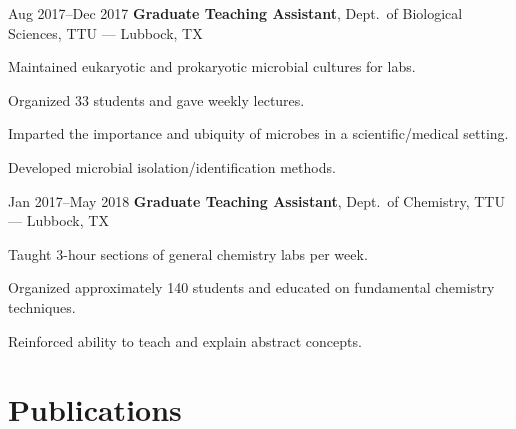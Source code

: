 \documentclass{resume}
\begin{document}
        \begin{twocolentry}{Aug 2017--Dec 2017}
            \textbf{Graduate Teaching Assistant}, Dept.\ of Biological Sciences, TTU --- Lubbock, TX
        \end{twocolentry}
        \vspace{0.10cm}
        \begin{onecolentry}
            \begin{highlights}
                \item Maintained eukaryotic and prokaryotic microbial cultures for labs.
                \item Organized 33 students and gave weekly lectures.
                \item Imparted the importance and ubiquity of microbes in a scientific/medical setting.
                \item Developed microbial isolation/identification methods.
            \end{highlights}
        \end{onecolentry}
        \vspace{0.2cm}

        \begin{twocolentry}{Jan 2017--May 2018}
            \textbf{Graduate Teaching Assistant}, Dept.\ of Chemistry, TTU --- Lubbock, TX
        \end{twocolentry}
        \vspace{0.10cm}
        \begin{onecolentry}
            \begin{highlights}
                \item Taught 3-hour sections of general chemistry labs per week.
                \item Organized approximately 140 students and educated on fundamental chemistry techniques.
                \item Reinforced ability to teach and explain abstract concepts.
            \end{highlights}
        \end{onecolentry}

    \section{Publications}
\end{document}
